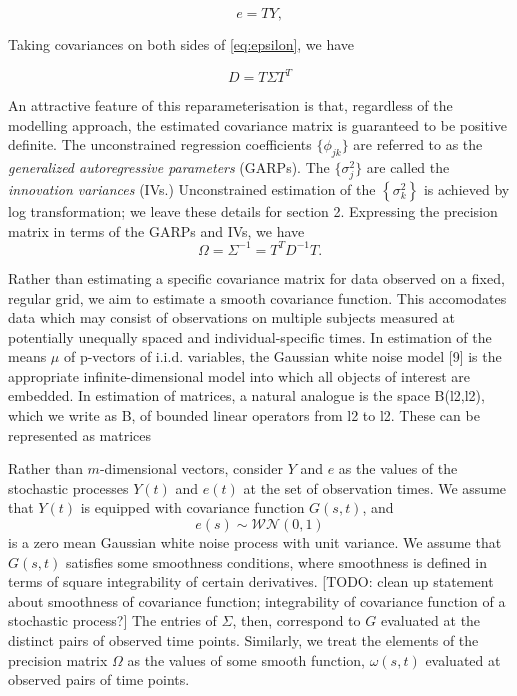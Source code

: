 \documentclass[12pt]{article}
\theoremstyle{definition}
\begin{document}
\begin{equation}
e = T Y, \label{eq:epsilon}
\end{equation}
\noindent

Taking covariances on both sides of \ref{eq:epsilon}, we have

\begin{equation} \label{eq:cholesky_decomp}
D = T \Sigma T^T 
\end{equation} 

An attractive feature of this reparameterisation is that, regardless of the modelling approach, the estimated covariance matrix is guaranteed to be positive definite. The unconstrained regression coefficients $\lbrace \phi_{jk} \rbrace$ are referred to as the \emph{generalized autoregressive parameters} (GARPs). The $\lbrace \sigma^2_{j} \rbrace$ are called the \emph{innovation variances} (IVs.)  Unconstrained estimation of the $\left\{ \sigma_{k}^2 \right\}$ is achieved by log transformation;  we leave these details for section 2. Expressing the precision matrix  in terms of the GARPs and IVs, we have
\begin{equation} \label{eq:omega_decomp}
\Omega= \Sigma^{-1} = T^T D^{-1} T.
\end{equation}

Rather than estimating a specific covariance matrix for data observed on a fixed, regular grid, we aim to estimate a smooth covariance function. This accomodates data which may consist of  observations on multiple subjects measured at potentially unequally spaced and individual-specific times. In estimation of the means $\mu$ of p-vectors of i.i.d. variables, the
Gaussian white noise model [9] is the appropriate infinite-dimensional model into
which all objects of interest are embedded. In estimation of matrices, a natural
analogue is the space B(l2,l2), which we write as B, of bounded linear operators
from l2 to l2. These can be represented as matrices

Rather than $m$-dimensional vectors, consider $Y$ and $e$ as the values of the stochastic processes $Y\left(t\right)$ and $e\left(t\right)$ at the set of observation times.  We assume that $Y\left(t\right)$ is equipped with covariance function $G\left(s,t\right)$, and
\[
e\left(s\right) \sim \mathcal{WN}\left(0,1\right)
\] 
is a zero mean Gaussian white noise process with unit variance. We assume that $G\left(s,t\right)$ satisfies some smoothness conditions, where smoothness is defined in terms of square integrability of certain derivatives. [TODO: clean up statement about smoothness of covariance function; integrability of covariance function of a stochastic process?] The entries of $\Sigma$, then, correspond to $G$ evaluated at the distinct pairs of observed time points. Similarly, we treat the elements of the precision matrix $\Omega$ as the values of some smooth function, $\omega\left(s,t\right)$ evaluated at observed pairs of time points.
\end{document}
